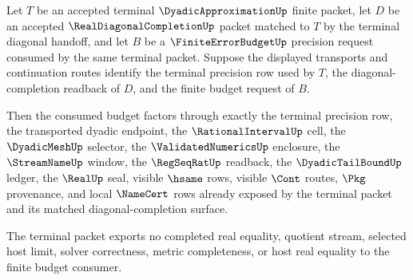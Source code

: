 \begin{theorem}
\label{thm:dyadicapproximation-terminal-tail-budget-exhaustion}
Let $T$ be an accepted terminal $\DyadicApproximationUp$ finite packet, let $D$ be an accepted $\RealDiagonalCompletionUp$ packet matched to $T$ by the terminal diagonal handoff, and let $B$ be a $\FiniteErrorBudgetUp$ precision request consumed by the same terminal packet. Suppose the displayed transports and continuation routes identify the terminal precision row used by $T$, the diagonal-completion readback of $D$, and the finite budget request of $B$.

Then the consumed budget factors through exactly the terminal precision row, the transported dyadic endpoint, the $\RationalIntervalUp$ cell, the $\DyadicMeshUp$ selector, the $\ValidatedNumericsUp$ enclosure, the $\StreamNameUp$ window, the $\RegSeqRatUp$ readback, the $\DyadicTailBoundUp$ ledger, the $\RealUp$ seal, visible $\hsame$ rows, visible $\Cont$ routes, $\Pkg$ provenance, and local $\NameCert$ rows already exposed by the terminal packet and its matched diagonal-completion surface.

The terminal packet exports no completed real equality, quotient stream, selected host limit, solver correctness, metric completeness, or host real equality to the finite budget consumer.
\end{theorem}
